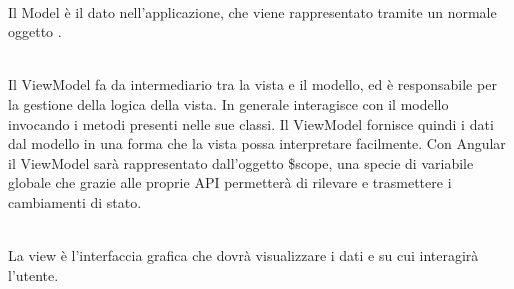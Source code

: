 \documentclass[a4paper, titlepage]{article}
\begin{document}
\begin{description}
\item{} 
\\ Il Model è il dato nell’applicazione, che viene rappresentato tramite un normale oggetto .
\item{}
\\ Il ViewModel fa da intermediario tra la vista e il modello, ed è responsabile per la gestione della logica della vista. In generale interagisce con il modello invocando i metodi presenti nelle sue classi.
Il ViewModel fornisce quindi i dati dal modello in una forma che la vista possa interpretare facilmente.
\newline Con Angular il ViewModel sarà rappresentato dall’oggetto \$scope, una specie di variabile globale  che grazie alle proprie API permetterà di rilevare e trasmettere i cambiamenti di stato.
\item{}
\\ La view è l’interfaccia grafica che dovrà visualizzare i dati e su cui interagirà l'utente.
\end{description}
\end{document}
